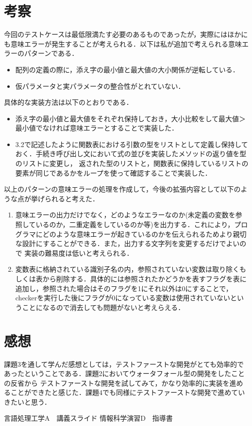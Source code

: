 \documentclass[dvipdfmx]{jarticle}
\begin{document}
\section{考察}
今回のテストケースは最低限満たす必要のあるものであったが，実際にはほかにも意味エラーが発生することが考えられる．以下は私が追加で考えられる意味エラーのパターンである．
\begin{itemize}
  \item 配列の定義の際に，添え字の最小値と最大値の大小関係が逆転している．
  \item 仮パラメータと実パラメータの整合性がとれていない．
\end{itemize}
具体的な実装方法は以下のとおりである．
\begin{itemize}
  \item 添え字の最小値と最大値をそれぞれ保持しておき，大小比較をして最大値＞最小値でなければ意味エラーとすることで実装した．
  \item 3.2で記述したように関数表における引数の型をリストとして定義し保持しておく．手続き呼び出し文において式の並びを実装したメソッドの返り値を型のリストに変更し，
  返された型のリストと，関数表に保持しているリストの要素が同じであるかをループを使って確認することで実装した．
\end{itemize}
以上のパターンの意味エラーの処理を作成して，今後の拡張内容として以下のような点が挙げられると考えた．
\begin{enumerate}
  \item 意味エラーの出力だけでなく，どのようなエラーなのか(未定義の変数を参照しているのか，二重定義をしているのか等)を出力する．これにより，プログラマにどのような意味エラーが起きているのかを伝えられるためより親切な設計にすることができる．また，出力する文字列を変更するだけでよいので
  実装の難易度は低いと考えられる．
  \item 変数表に格納されている識別子名の内，参照されていない変数は取り除くもしくは表から削除する．具体的には参照されたかどうかを表すフラグを表に追加し，参照された場合はそのフラグを1にそれ以外は0にすることで，
  checkerを実行した後にフラグが0になっている変数は使用されていないということになるので消去しても問題がないと考えらえる．
\end{enumerate}
\section{感想}
課題3を通して学んだ感想としては，テストファーストな開発がとても効率的であったということである．課題2においてウォータフォール型の開発をしたことの反省から
テストファーストな開発を試してみて，かなり効率的に実装を進めることができたと感じた．課題4でも同様にテストファーストな開発で進めていきたいと思う．
\begin{thebibliography}{1}
     言語処理工学A　講義スライド
     情報科学演習D　指導書
\end{thebibliography}
\end{document}

